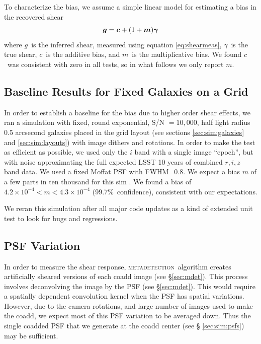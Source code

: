 \documentclass[twocolumn,twocolappendix,astrosym]{openjournal}
\newcommand{\vecg}{\mbox{\boldmath $g$}}
\newcommand{\vecc}{\mbox{\boldmath $c$}}
\newcommand{\vecm}{\mbox{\boldmath $m$}}
\newcommand{\mdet}{\textsc{metadetection}}
\newcommand{\vecgam}{\mbox{\boldmath $\gamma$}}
\begin{document}
To characterize the bias, we assume a simple linear model \citep[see,
e.g.,][]{heymans2006} for estimating a bias in the recovered shear
\begin{equation} \label{eq:m}
\vecg = \vecc + (1 + \vecm) \vecgam
\end{equation}
where \vecg\ is the inferred shear, measured using equation \ref{eq:shearmeas},
\vecgam\ is the true shear, \vecc\ is the additive bias, and \vecm\ is the
multiplicative bias. We found \vecc\ was consistent with zero in all tests, so
in what follows we only report \vecm.

\subsection{Baseline Results for Fixed Galaxies on a Grid} \label{sec:results:base}

In order to establish a baseline for the bias due to higher order shear
effects, we ran a simulation with fixed, round exponential, S/N $= 10,000$,
half light radius 0.5 arcsecond galaxies placed in the grid layout (see
sections \ref{sec:sim:galaxies} and \ref{sec:sim:layouts}) with image dithers
and rotations.  In order to make the test as efficient as possible, we used
only the $i$ band with a single image ``epoch'', but with noise approximating
the full expected LSST 10 years of combined $r, i, z$ band data.  We used a
fixed Moffat PSF\citep{Moffat1969} with FWHM=0.8.  We expect a bias $m$ of a
few parts in ten thousand for this sim \citep{SheldonMcal2017}.  We found a
bias of $4.2\times 10^{-4} < m < 4.3\times 10^{-4}$ (99.7\%~confidence),
consistent with our expectations.

We reran this simulation after all major code updates as a kind of extended
unit test to look for bugs and regressions.

\subsection{PSF Variation} \label{sec:results:psfvar}

In order to measure the shear response, \mdet\ algorithm creates artificially
sheared versions of each coadd image (see \S \ref{sec:mdet}).  This process
involves deconvolving the image by the PSF (see \S \ref{sec:mdet}).  This would
require a spatially dependent convolution kernel when the PSF has spatial
variations.  However, due to the camera rotations, and large number of images
used to make the coadd, we expect most of this PSF variation to be averaged
down.  Thus the single coadded PSF that we generate at the coadd center (see \S
\ref{sec:sim:psfs}) may be sufficient.
\end{document}
